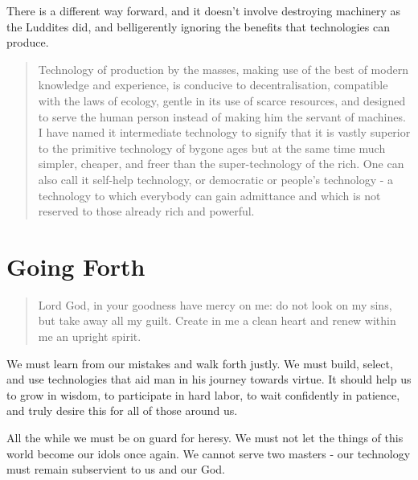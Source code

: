 \documentclass[letterpaper]{article}
\begin{document}
There is a different way forward, and it doesn't involve destroying machinery as the Luddites did, and belligerently ignoring the benefits that technologies can produce.

\begin{quote}
  Technology of production by the masses, making use of the best of modern knowledge and experience, is conducive to decentralisation, compatible with the laws of ecology, gentle in its use of scarce resources, and designed to serve the human person instead of making him the servant of machines. I have named it intermediate technology to signify that it is vastly superior to the primitive technology of bygone ages but at the same time much simpler, cheaper, and freer than the super-technology of the rich. One can also call it self-help technology, or democratic or people's technology - a technology to which everybody can gain admittance and which is not reserved to those already rich and powerful.
\end{quote}

\section{Going Forth}

\begin{quote}
  Lord God, in your goodness have mercy on me: do not look on my sins, but take away all my guilt. Create in me a clean heart and renew within me an upright spirit.
\end{quote}

We must learn from our mistakes and walk forth justly. We must build, select, and use technologies that aid man in his journey towards virtue. It should help us to grow in wisdom, to participate in hard labor, to wait confidently in patience, and truly desire this for all of those around us.

All the while we must be on guard for heresy. We must not let the things of this world become our idols once again. We cannot serve two masters - our technology must remain subservient to us and our God.
\end{document}
